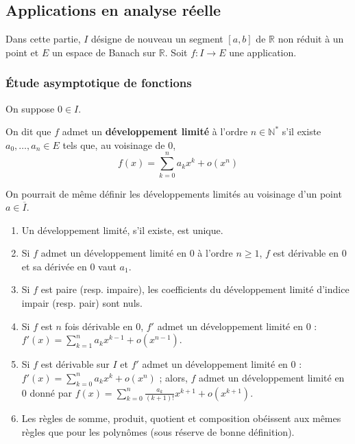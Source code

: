 	\subsection{Applications en analyse réelle}
	
	Dans cette partie, $I$ désigne de nouveau un segment $[a,b]$ de $\mathbb{R}$ non réduit à un point et $E$ un espace de Banach sur $\mathbb{R}$. Soit $f : I \rightarrow E$ une application.
	
	\subsubsection{Étude asymptotique de fonctions}
	
	
	On suppose $0 \in I$.
	
	\begin{definition}
		On dit que $f$ admet un \textbf{développement limité} à l'ordre $n \in \mathbb{N}^*$ s'il existe $a_0, \dots, a_n \in E$ tels que, au voisinage de $0$,
		\[ f(x) = \sum_{k=0}^{n} a_k x^k + o(x^n) \]
	\end{definition}
	
	\begin{remark}
		On pourrait de même définir les développements limités au voisinage d'un point $a \in \overline{I}$.
	\end{remark}
	
	\begin{proposition}
		\begin{enumerate}[label=(\roman*)]
			\item Un développement limité, s'il existe, est unique.
			\item Si $f$ admet un développement limité en $0$ à l'ordre $n \geq 1$, $f$ est dérivable en $0$ et sa dérivée en $0$ vaut $a_1$.
			\item Si $f$ est paire (resp. impaire), les coefficients du développement limité d'indice impair (resp. pair) sont nuls.
			\item Si $f$ est $n$ fois dérivable en $0$, $f'$ admet un développement limité en $0$ : $f'(x) = \sum_{k=1}^{n} a_k x^{k-1} + o(x^{n-1})$.
			\item Si $f$ est dérivable sur $I$ et $f'$ admet un développement limité en $0$ : $f'(x) = \sum_{k=0}^{n} a_k x^k + o(x^n)$ ; alors, $f$ admet un développement limité en $0$ donné par $f(x) = \sum_{k=0}^{n} \frac{a_k}{(k+1)!} x^{k+1} + o(x^{k+1})$.
			\item Les règles de somme, produit, quotient et composition obéissent aux mêmes règles que pour les polynômes (sous réserve de bonne définition).
		\end{enumerate}
	\end{proposition}
	
